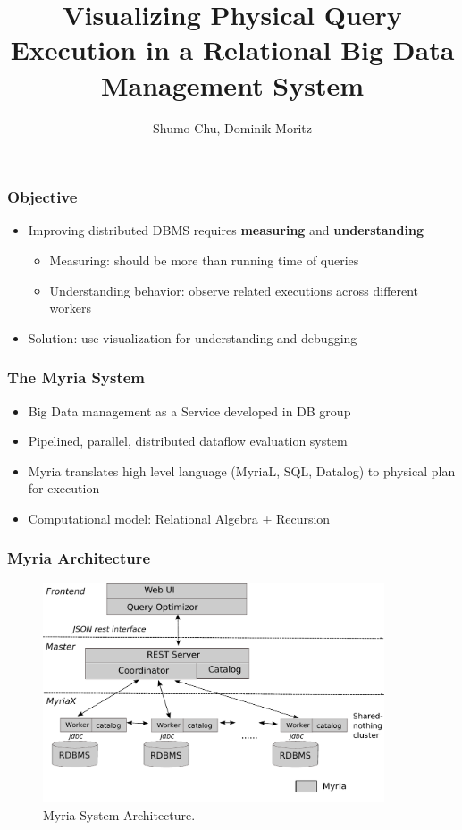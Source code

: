 \documentclass[mathserif,serif]{beamer}
\title[Query Visualization] %
{Visualizing Physical Query Execution in a Relational Big Data Management System}
\subtitle{}
\author[Chu, moritz] %
{Shumo Chu, Dominik Moritz}
\begin{document}
\begin{frame}
\titlepage

\end{frame}

\begin{frame}
  \frametitle{Objective}
  \begin{itemize}
  	\item Improving distributed DBMS requires \textbf{measuring} and \textbf{understanding}
    \begin{itemize}
      \item Measuring: should be more than running time of queries
      \item Understanding behavior: observe related executions across different workers
    \end{itemize}
    \item Solution: use visualization for understanding and debugging
  \end{itemize}
\end{frame}

\begin{frame}
  \frametitle{The Myria System}
  \begin{itemize}
  	\item Big Data management as a Service developed in DB group
  	\item Pipelined, parallel, distributed dataflow evaluation system
  	\item Myria translates high level  language (MyriaL, SQL, Datalog) 
  	to physical plan for execution
  	\item Computational model: Relational Algebra + Recursion
  \end{itemize}
\end{frame}

\begin{frame}
  \frametitle{Myria Architecture}
  \begin{figure}
   \begin{center}
       \includegraphics[width=0.9\textwidth]{myria_arch.pdf}
     \end{center}
    \caption{Myria System Architecture.}
    \label{fig:myria_arc}
  \end{figure}
\end{frame}
\end{document}
